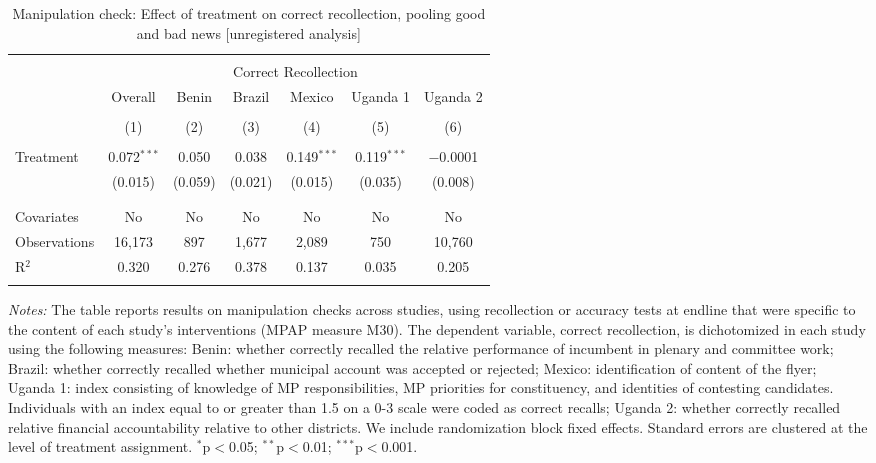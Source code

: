 
\begin{table}[!htbp] \centering 
  \caption{Manipulation check: Effect of treatment on correct recollection, pooling good and bad news [unregistered analysis]} 
  \label{mcheck} 
\begin{tabular}{@{\extracolsep{1pt}}lcccccc} 
\\[-1.8ex]\hline 
\hline \\[-1.8ex] 
 & \multicolumn{6}{c}{Correct Recollection} \\ 
\cline{2-7} 
 & Overall & Benin & Brazil & Mexico & Uganda 1 & Uganda 2 \\ 
\\[-1.8ex] & (1) & (2) & (3) & (4) & (5) & (6)\\ 
\hline \\[-1.8ex] 
 Treatment & 0.072$^{***}$ & 0.050 & 0.038 & 0.149$^{***}$ & 0.119$^{***}$ & $-$0.0001 \\ 
  & (0.015) & (0.059) & (0.021) & (0.015) & (0.035) & (0.008) \\ 
  & & & & & & \\ 
\hline \\[-1.8ex] 
Covariates & No & No & No & No & No & No \\ 
Observations & 16,173 & 897 & 1,677 & 2,089 & 750 & 10,760 \\ 
R$^{2}$ & 0.320 & 0.276 & 0.378 & 0.137 & 0.035 & 0.205 \\ 
\hline 
\hline \\[-1.8ex] 
\end{tabular} 
\begin{flushleft}\textit{Notes:} The table reports results on manipulation checks across studies, using recollection or accuracy tests at endline that were specific to the content of each study's interventions (MPAP measure M30). The dependent variable, correct recollection, is dichotomized in each study using the following measures: Benin: whether correctly recalled the relative performance of incumbent in plenary and committee work; Brazil: whether correctly recalled whether municipal account was accepted or rejected; Mexico: identification of content of the flyer; Uganda 1: index consisting of knowledge of MP responsibilities, MP priorities for constituency, and identities of contesting candidates. Individuals with an index equal to or greater than 1.5 on a 0-3 scale were coded as correct recalls; Uganda 2: whether correctly recalled relative financial accountability relative to other districts. We include randomization block fixed effects. Standard errors are clustered at the level of treatment assignment. $^{*}$p$<$0.05; $^{**}$p$<$0.01; $^{***}$p$<$0.001.\end{flushleft}
\end{table} 
